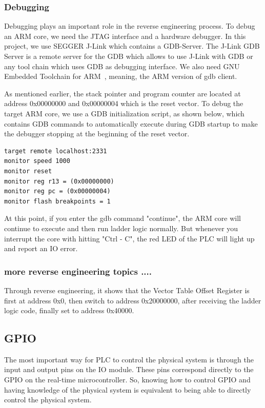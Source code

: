 \subsubsection{Debugging}

Debugging plays an important role in the reverse engineering process. To debug an ARM core, we need the JTAG interface and a hardware debugger. In this project, we use SEGGER J-Link which contains a GDB-Server. The J-Link GDB Server is a remote server for the GDB which allows to use J-Link with GDB or any tool chain which uses GDB as debugging interface. We also need GNU Embedded Toolchain for ARM~\cite{gnutoolchainarm}, meaning, the ARM version of gdb client.

As mentioned earlier, the stack pointer and program counter are located at address 0x00000000 and 0x00000004 which is the reset vector. To debug the target ARM core, we use a GDB initialization script, as shown below, which contains GDB commands to automatically execute during GDB startup to make the debugger stopping at the beginning of the reset vector.  

\begin{lstlisting}[basicstyle=\small, caption={GDB stript file .gdbinit}, captionpos=b]
target remote localhost:2331
monitor speed 1000
monitor reset
monitor reg r13 = (0x00000000)
monitor reg pc = (0x00000004)
monitor flash breakpoints = 1
\end{lstlisting}

At this point, if you enter the gdb command "continue", the ARM core will continue to execute and then run ladder logic normally. But whenever you interrupt the core with hitting "Ctrl - C", the red LED of the PLC will light up and report an IO error. 


\subsubsection{more reverse engineering topics ....}

Through reverse engineering, it shows that the Vector Table Offset Register is first at address 0x0, then switch to address 0x20000000, after receiving the ladder logic code, finally set to address 0x40000. 

\subsection{GPIO}
The most important way for PLC to control the physical system is through the input and output pins on the IO module. These pins correspond directly to the GPIO on the real-time microcontroller. So, knowing how to control GPIO and having knowledge of the physical system is equivalent to being able to directly control the physical system.

